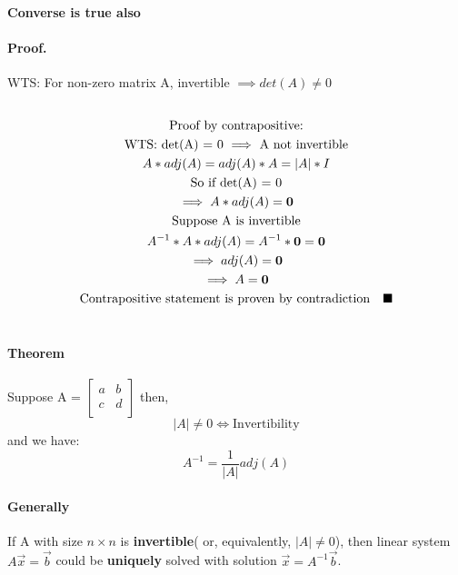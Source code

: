 \documentclass{article}
\begin{document}
	\paragraph{Converse is true also}
	\paragraph{Proof.} WTS: For non-zero matrix A, invertible $ \implies det(A) \neq 0$
	\begin{multline}
		\\
		\text{Proof by contrapositive:}\\
		\text{WTS: det(A) = 0 $\implies$ A not invertible} \\
		A * adj(A) = adj(A) * A = \lvert A \rvert * I \\
		\text{So if det(A) = 0} \\
		\implies A * adj(A) = \textbf{0} \\
		\text{Suppose A is invertible} \\
		A^{-1} * A * adj(A) = A^{-1} * \textbf{0} = \textbf{0} \\
		\implies adj(A) = \textbf{0}\\
		\implies A = \textbf{0} \\
		\text{Contrapositive statement is proven by contradiction\quad}\blacksquare \\
		\\
	\end{multline}
	\paragraph{Theorem} Suppose A = $\begin{bmatrix}
		a & b \\
		c & d \\
	\end{bmatrix}$ then,
	\[
	\lvert A \rvert \neq 0 \iff \text{Invertibility}
	\]
	and we have:
	\[
	A^{-1} = \frac{1}{\lvert A \rvert} adj(A)
	\]
	\paragraph{Generally} If A with size $n \times n$ is \textbf{invertible}( or, equivalently, $\lvert A \rvert \neq 0$), then linear system $A \vec{x} = \vec{b}$ could be \textbf{uniquely} solved with solution $\vec{x} = A^{-1}\vec{b}$.
\end{document}
